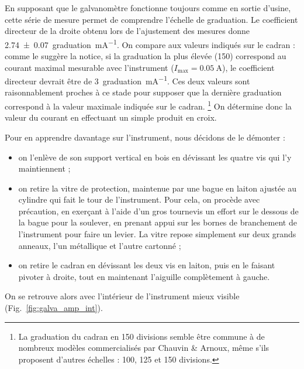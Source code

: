 \documentclass[12pt,a4paper,fleqn]{article}
\begin{document}
En supposant que le galvanomètre fonctionne toujours comme en sortie d'usine, cette série de mesure permet de comprendre l'échelle de graduation.
Le coefficient directeur de la droite obtenu lors de l'ajustement des mesures donne \SI{2.74(7)}{graduation\per\milli\ampere}.
On compare aux valeurs indiqués sur le cadran : comme le suggère la notice, si la graduation la plus élevée (150) correspond au courant maximal mesurable avec l'instrument ($I_\mathrm{max}=\SI{0.05}{\ampere}$), le coefficient directeur devrait être de \SI{3}{graduation\per\milli\ampere}.
Ces deux valeurs sont raisonnablement proches à ce stade pour supposer que la dernière graduation correspond à la valeur maximale indiquée sur le cadran.
\footnote{La graduation du cadran en 150 divisions semble être commune à de nombreux modèles commercialisés par Chauvin \& Arnoux, même s'ils proposent d'autres échelles : 100, 125 et 150 divisions.}
On détermine donc la valeur du courant en effectuant un simple produit en croix.

Pour en apprendre davantage sur l'instrument, nous décidons de le démonter :
\begin{itemize}
    \item on l'enlève de son support vertical en bois en dévissant les quatre vis qui l'y maintiennent ;
    \item on retire la vitre de protection, maintenue par une bague en laiton ajustée au cylindre qui fait le tour de l'instrument.
    Pour cela, on procède avec précaution, en exerçant à l'aide d'un gros tournevis un effort sur le dessous de la bague pour la soulever, en prenant appui sur les bornes de branchement de l'instrument pour faire un levier.
    La vitre repose simplement sur deux grands anneaux, l'un métallique et l'autre cartonné ;
    \item on retire le cadran en dévissant les deux vis en laiton, puis en le faisant pivoter à droite, tout en maintenant l'aiguille complètement à gauche.
\end{itemize}
On se retrouve alors avec l'intérieur de l'instrument mieux visible (Fig.~\ref{fig:galva_amp_int}).
\end{document}
